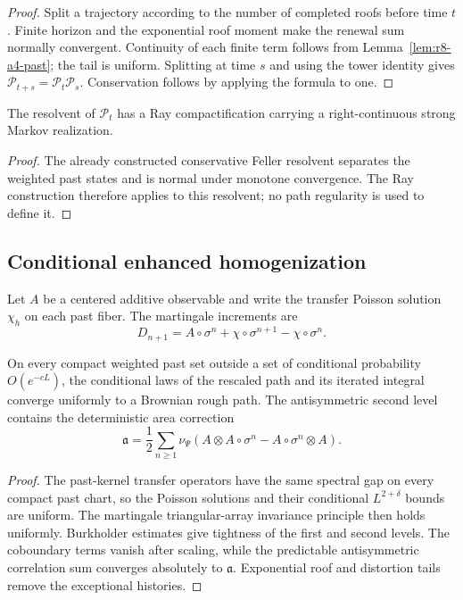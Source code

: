 \begin{proof}
Split a trajectory according to the number of completed roofs before time
$t$.  Finite horizon and the exponential roof moment make the renewal sum
normally convergent.  Continuity of each finite term follows from
Lemma~\ref{lem:r8-a4-past}; the tail is uniform.  Splitting at time $s$ and
using the tower identity gives $\mathcal P_{t+s}=\mathcal P_t\mathcal P_s$.
Conservation follows by applying the formula to one.
\end{proof}

\begin{corollary}
\label{cor:r8-a4-ray}
The resolvent of $\mathcal P_t$ has a Ray compactification carrying a
right-continuous strong Markov realization.
\end{corollary}

\begin{proof}
The already constructed conservative Feller resolvent separates the weighted
past states and is normal under monotone convergence.  The Ray construction
therefore applies to this resolvent; no path regularity is used to define it.
\end{proof}

\subsection{Conditional enhanced homogenization}

Let $A$ be a centered additive observable and write the transfer Poisson
solution $\chi_h$ on each past fiber.  The martingale increments are
\[
 D_{n+1}=A\circ\sigma^n+\chi\circ\sigma^{n+1}-\chi\circ\sigma^n.
\]

\begin{theorem}
\label{thm:r8-a4-rough}
On every compact weighted past set outside a set of conditional probability
$O(e^{-cL})$, the conditional laws of the rescaled path and its iterated
integral converge uniformly to a Brownian rough path.  The antisymmetric
second level contains the deterministic area correction
\[
 \mathfrak a=\frac12\sum_{n\ge1}
 \nu_\Psi(A\otimes A\circ\sigma^n-A\circ\sigma^n\otimes A).
\]
\end{theorem}

\begin{proof}
The past-kernel transfer operators have the same spectral gap on every compact
past chart, so the Poisson solutions and their conditional $L^{2+\delta}$
bounds are uniform.  The martingale triangular-array invariance principle then
holds uniformly.  Burkholder estimates give tightness of the first and second
levels.  The coboundary terms vanish after scaling, while the predictable
antisymmetric correlation sum converges absolutely to $\mathfrak a$.
Exponential roof and distortion tails remove the exceptional histories.
\end{proof}

